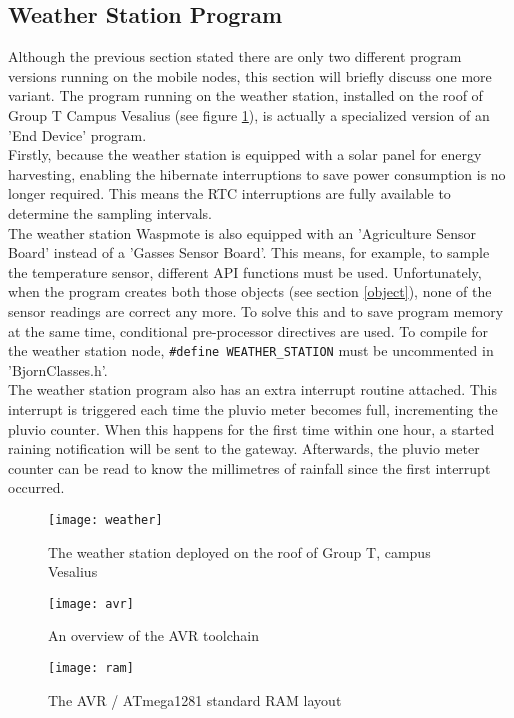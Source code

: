 
\subsection{Weather Station Program}

Although the previous section stated there are only two different program versions running on the mobile nodes, this section will briefly discuss one more variant. The program running on the weather station, installed on the roof of Group T Campus Vesalius (see figure \ref{fig:weather}), is actually a specialized version of an 'End Device' program.\\
Firstly, because the weather station is equipped with a solar panel for energy harvesting, enabling the hibernate interruptions to save power consumption is no longer required. This means the RTC interruptions are fully available to determine the sampling intervals.\\
The weather station Waspmote is also equipped with an 'Agriculture Sensor Board' instead of a 'Gasses Sensor Board'. This means, for example, to sample the temperature sensor, different API functions must be used. Unfortunately, when the program creates both those objects (see section \ref{object}), none of the sensor readings are  correct any more. To solve this and to save program memory at the same time, conditional pre-processor directives are used. To compile for the weather station node, \verb+#define WEATHER_STATION+ must be uncommented in 'BjornClasses.h'.\\
The weather station program also has an extra interrupt routine attached. This interrupt is triggered each time the pluvio meter becomes full, incrementing the pluvio counter. When this happens for the first time within one hour, a started raining notification will be sent to the gateway. Afterwards, the pluvio meter counter can be read to know the millimetres of rainfall since the first interrupt occurred.\\
\begin{figure}[t]
\centering
\texttt{[image: weather]}
\caption{The weather station deployed on the roof of Group T, campus Vesalius}
\label{fig:weather}
\end{figure}
\begin{figure}[H]%
\centering
\texttt{[image: avr]}
\caption{An overview of the AVR toolchain}
\label{fig:tool}
\end{figure}
\begin{figure}[H]
\centering
\texttt{[image: ram]}
\caption{The AVR / ATmega1281 standard RAM layout}
\label{fig:RAM}
\end{figure}
